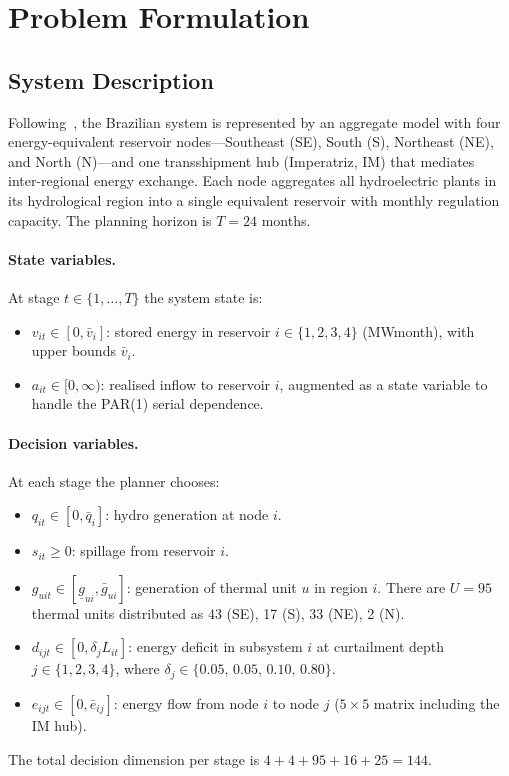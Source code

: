 \documentclass[11pt,letterpaper]{article}
\begin{document}
\section{Problem Formulation}
\label{sec:problem}

\subsection{System Description}
\label{sec:system}

Following~\citet{shapiro2013}, the Brazilian system is represented by an aggregate
model with four energy-equivalent reservoir nodes---Southeast (SE), South (S),
Northeast (NE), and North (N)---and one transshipment hub (Imperatriz, IM) that
mediates inter-regional energy exchange.
Each node aggregates all hydroelectric plants in its hydrological region into a
single equivalent reservoir with monthly regulation capacity.
The planning horizon is $T = 24$ months.

\paragraph{State variables.}
At stage $t \in \{1,\ldots,T\}$ the system state is:
\begin{itemize}[noitemsep]
  \item $v_{it} \in [0, \bar{v}_i]$: stored energy in reservoir $i \in \{1,2,3,4\}$
        (MWmonth), with upper bounds $\bar{v}_i$.
  \item $a_{it} \in [0, \infty)$: realised inflow to reservoir $i$, augmented as
        a state variable to handle the PAR(1) serial dependence.
\end{itemize}

\paragraph{Decision variables.}
At each stage the planner chooses:
\begin{itemize}[noitemsep]
  \item $q_{it} \in [0, \bar{q}_i]$: hydro generation at node $i$.
  \item $s_{it} \ge 0$: spillage from reservoir $i$.
  \item $g_{uit} \in [\underline{g}_{ui}, \bar{g}_{ui}]$: generation of thermal
        unit $u$ in region $i$.  There are $U = 95$ thermal units distributed as
        43 (SE), 17 (S), 33 (NE), 2 (N).
  \item $d_{ijt} \in [0, \delta_j L_{it}]$: energy deficit in subsystem $i$ at
        curtailment depth $j \in \{1,2,3,4\}$, where
        $\delta_j \in \{0.05,\, 0.05,\, 0.10,\, 0.80\}$.
  \item $e_{ijt} \in [0, \bar{e}_{ij}]$: energy flow from node $i$ to node $j$
        ($5 \times 5$ matrix including the IM hub).
\end{itemize}
The total decision dimension per stage is $4 + 4 + 95 + 16 + 25 = 144$.
\end{document}
